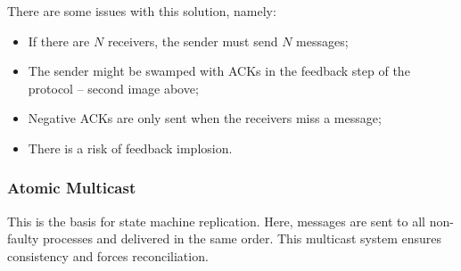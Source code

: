 \documentclass{article}
\begin{document}
There are some issues with this solution, namely:
\begin{itemize}
	\item If there are $N$ receivers, the sender must send $N$ messages;
	\item The sender might be swamped with ACKs in the feedback step of the protocol -- second image above;
	\item Negative ACKs are only sent when the receivers miss a message;
	\item There is a risk of feedback implosion.
\end{itemize}

\subsubsection{Atomic Multicast}
This is the basis for state machine replication. Here, messages are sent to all non-faulty processes and delivered in the same order. This multicast system ensures consistency and forces reconciliation.
\end{document}
